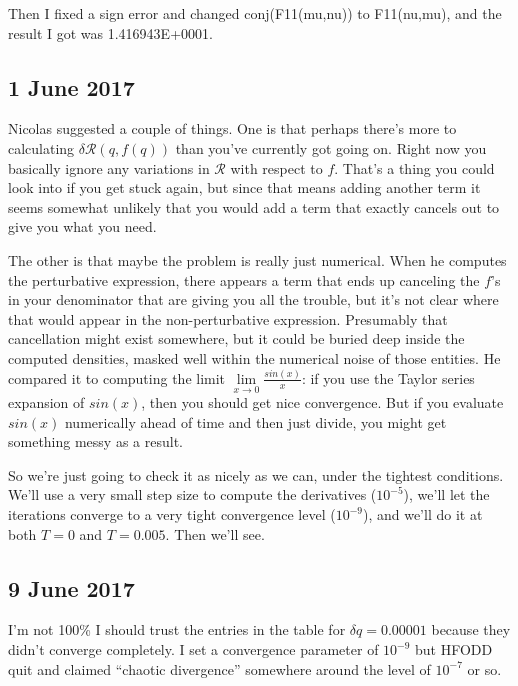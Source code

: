 Then I fixed a sign error and changed conj(F11(mu,nu)) to F11(nu,mu), and the result I got was 1.416943E+0001.

\subsection*{1 June 2017}

Nicolas suggested a couple of things. One is that perhaps there's more to calculating $\delta \mathcal{R}(q,f(q))$ than you've currently got going on. Right now you basically ignore any variations in $\mathcal{R}$ with respect to $f$. That's a thing you could look into if you get stuck again, but since that means adding another term it seems somewhat unlikely that you would add a term that exactly cancels out to give you what you need.

The other is that maybe the problem is really just numerical. When he computes the perturbative expression, there appears a term that ends up canceling the $f$'s in your denominator that are giving you all the trouble, but it's not clear where that would appear in the non-perturbative expression. Presumably that cancellation might exist somewhere, but it could be buried deep inside the computed densities, masked well within the numerical noise of those entities. He compared it to computing the limit $\lim\limits_{x\rightarrow0}\frac{sin(x)}{x}$: if you use the Taylor series expansion of $sin(x)$, then you should get nice convergence. But if you evaluate $sin(x)$ numerically ahead of time and then just divide, you might get something messy as a result.

So we're just going to check it as nicely as we can, under the tightest conditions. We'll use a very small step size to compute the derivatives ($10^{-5}$), we'll let the iterations converge to a very tight convergence level ($10^{-9}$), and we'll do it at both $T=0$ and $T=0.005$. Then we'll see.

\subsection*{9 June 2017}
I'm not 100\% I should trust the entries in the table for $\delta q=0.00001$ because they didn't converge completely. I set a convergence parameter of $10^{-9}$ but HFODD quit and claimed ``chaotic divergence'' somewhere around the level of $10^{-7}$ or so.

